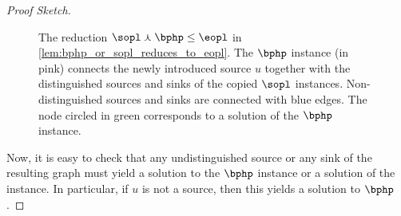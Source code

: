 \documentclass[10pt,a4paper]{article}
\newcommand{\spacex}{1.5}
\newcommand{\spacey}{1.125}
\theoremstyle{definition}
\theoremstyle{plain}
\theoremstyle{remark}
\begin{document}
\begin{proof}[Proof Sketch]
\begin{figure}[th]
\caption{The reduction $\sopl\curlywedge\bphp\leq\eopl$ in \cref{lem:bphp_or_sopl_reduces_to_eopl}. The $\bphp$ instance (in pink) connects the newly introduced source $u$ together with the distinguished sources and sinks of the copied $\sopl$ instances. Non-distinguished sources and sinks are connected with blue edges. The node circled in green corresponds to a solution of the $\bphp$ instance.}
\label{figure:reduction_php_or_sopl_eopl}
\end{figure}

Now, it is easy to check that any undistinguished source or any sink of the resulting graph must yield a solution to the $\bphp$ instance or a solution of the \sopl instance. In particular, if $u$ is not a source, then this yields a solution to $\bphp$.
\end{proof}
\end{document}

